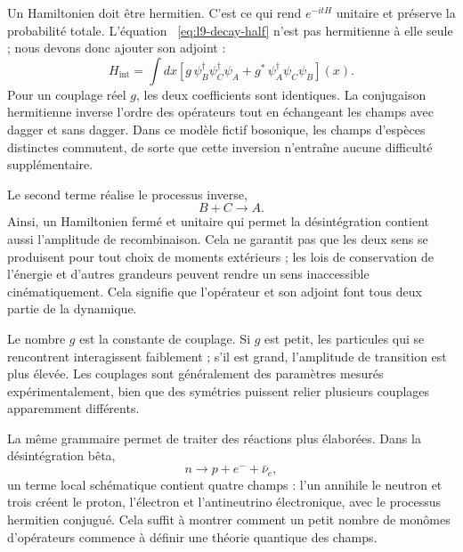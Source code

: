 Un Hamiltonien doit être hermitien. C’est ce qui rend \(e^{-itH}\) unitaire et préserve la probabilité totale. L’équation ~\eqref{eq:l9-decay-half} n’est pas hermitienne à elle seule ; nous devons donc ajouter son adjoint :
\begin{equation}
H_{\mathrm{int}}
=\int dx\left[
g\,\psi_B^\dagger\psi_C^\dagger\psi_A
+g^*\,\psi_A^\dagger\psi_C\psi_B
\right](x).
\label{eq:l9-hermitian-vertex}
\end{equation}
Pour un couplage réel \(g\), les deux coefficients sont identiques. La conjugaison hermitienne inverse l’ordre des opérateurs tout en échangeant les champs avec dagger et sans dagger. Dans ce modèle fictif bosonique, les champs d’espèces distinctes commutent, de sorte que cette inversion n’entraîne aucune difficulté supplémentaire.

Le second terme réalise le processus inverse,
\begin{equation}
B+C\longrightarrow A.
\end{equation}
Ainsi, un Hamiltonien fermé et unitaire qui permet la désintégration contient aussi l’amplitude de recombinaison. Cela ne garantit pas que les deux sens se produisent pour tout choix de moments extérieurs ; les lois de conservation de l’énergie et d’autres grandeurs peuvent rendre un sens inaccessible cinématiquement. Cela signifie que l’opérateur et son adjoint font tous deux partie de la dynamique.

\begin{classroomqa}
\end{classroomqa}

Le nombre \(g\) est la constante de couplage. Si \(g\) est petit, les particules qui se rencontrent interagissent faiblement ; s’il est grand, l’amplitude de transition est plus élevée. Les couplages sont généralement des paramètres mesurés expérimentalement, bien que des symétries puissent relier plusieurs couplages apparemment différents.

La même grammaire permet de traiter des réactions plus élaborées. Dans la désintégration bêta,
\begin{equation}
n\longrightarrow p+e^-+\bar\nu_e,
\end{equation}
un terme local schématique contient quatre champs : l’un annihile le neutron et trois créent le proton, l’électron et l’antineutrino électronique, avec le processus hermitien conjugué. Cela suffit à montrer comment un petit nombre de monômes d’opérateurs commence à définir une théorie quantique des champs.

